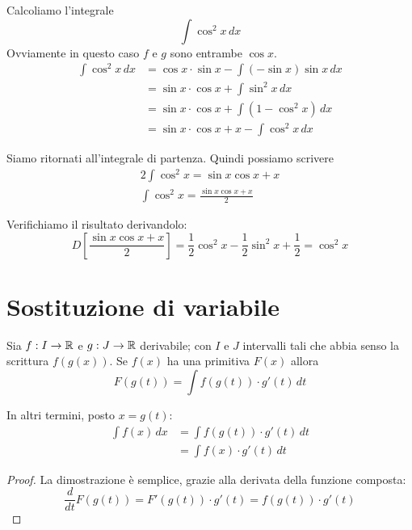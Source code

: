 \begin{example}
Calcoliamo l'integrale
\begin{equation*}
\int \cos^2x \, dx
\end{equation*}
Ovviamente in questo caso $f$ e $g$ sono entrambe $\cos x$.
\begin{align*}
\int \cos^2x \, dx &= \cos x \cdot \sin x - \int (-\sin x) \sin x \, dx \\
&= \sin x \cdot \cos x + \int \sin^2x \, dx \\
&= \sin x \cdot \cos x + \int (1-\cos^2x) \, dx \\
&= \sin x \cdot \cos x + x - \int \cos^2x \, dx
\end{align*}

Siamo ritornati all'integrale di partenza. Quindi possiamo scrivere
\begin{align*}
2 \int \cos^2x = \sin x\cos x + x \\
\int \cos^2x = \frac{\sin x\cos x + x}{2}
\end{align*}

Verifichiamo il risultato derivandolo:
\begin{equation*}
D\left[\frac{\sin x\cos x + x}{2}\right]= \frac{1}{2} \cos^2 x - \frac{1}{2} \sin^2 x + \frac{1}{2} = \cos^2 x
\end{equation*}
\end{example}

\section{Sostituzione di variabile}
\begin{theorem}
Sia $f: I \to \mathbb R$ e $g: J \to \mathbb R$ derivabile; con $I$ e $J$ intervalli tali che abbia senso la scrittura $f(g(x))$. Se $f(x)$ ha una primitiva $F(x)$ allora
\begin{equation*}
F(g(t)) = \int f(g(t)) \cdot g'(t) \, dt
\end{equation*}

In altri termini, posto $x = g(t)$:
\begin{align*}
\int f(x) \, dx &= \int f(g(t)) \cdot g'(t) \, dt \\
&= \int f(x) \cdot g'(t) \, dt
\end{align*}
\end{theorem}

\begin{proof}
La dimostrazione è semplice, grazie alla derivata della funzione composta:
\begin{equation*}
\frac{d}{dt} F(g(t)) = F'(g(t)) \cdot g'(t) = f(g(t)) \cdot g'(t)
\end{equation*}
\end{proof}


